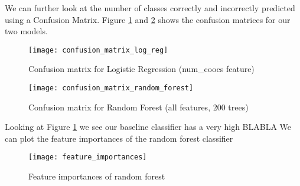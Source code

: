 We can further look at the number of classes correctly and incorrectly predicted using a Confusion Matrix. Figure \ref{fig:conf_matrix_log_reg} and \ref{fig:conf_matrix_random_forest} shows the confusion matrices for our two models.

\begin{figure}[H]
    \hspace*{-1.0cm}
    \centering
    \texttt{[image: confusion\_matrix\_log\_reg]}
    \caption{Confusion matrix for Logistic Regression (num\_coocs feature)}
    \label{fig:conf_matrix_log_reg}
\end{figure}
\begin{figure}[H]
    \hspace*{-1.0cm}
    \centering
    \texttt{[image: confusion\_matrix\_random\_forest]}
    \caption{Confusion matrix for Random Forest (all features, 200 trees)}
    \label{fig:conf_matrix_random_forest}
\end{figure}

Looking at Figure \ref{fig:conf_matrix_log_reg} we see our baseline classifier has a very high BLABLA
We can plot the feature importances of the random forest classifier
\begin{figure}[H]
    \hspace*{-1.0cm}
    \centering
    \texttt{[image: feature\_importances]}
    \caption{Feature importances of random forest}
    \label{fig:feature_importances}
\end{figure}